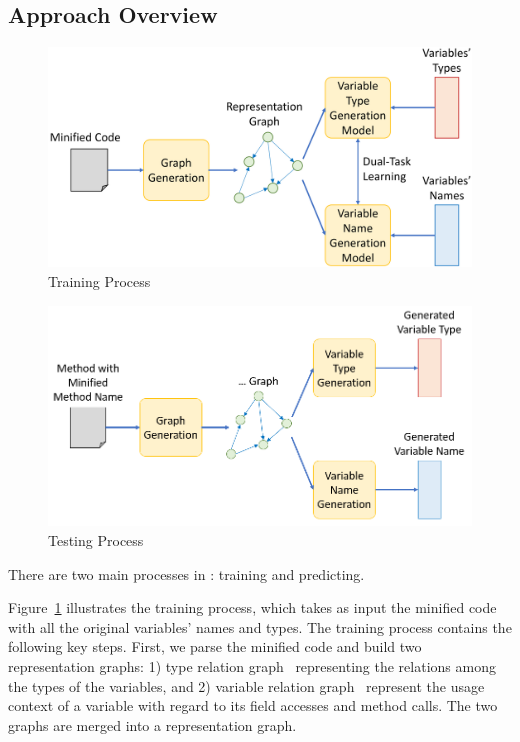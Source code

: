 \subsection{Approach Overview}


\begin{figure}[t]
	\begin{center}
	  \includegraphics[width=\columnwidth]{figures/training-2.png}
          \vspace{-15pt}
		\caption{Training Process}
		\label{training_process}
	\end{center}
\end{figure}

\begin{figure}[t]
	\begin{center}
		\includegraphics[width=.7\columnwidth]{figures/testing.png}
		\caption{Testing Process}
		\label{testing_process}
	\end{center}
\end{figure}

There are two main processes in {\tool}: training and predicting.

Figure~\ref{training_process} illustrates the training process, which
takes as input the minified code with all the original variables'
names and types. The training process contains the following key
steps. First, we parse the minified code and build two representation
graphs: 1) type relation graph~\cite{} representing the relations
among the types of the variables, and 2) variable relation
graph~\cite{icse19} represent the usage context of a variable with
regard to its field accesses and method calls. The two graphs are
merged into a representation graph.

